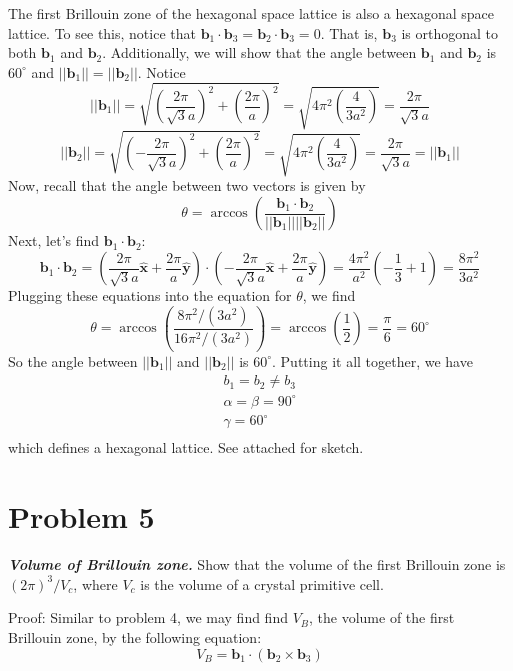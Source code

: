 \documentclass{article}
\begin{document}
The first Brillouin zone of the hexagonal space lattice is also a hexagonal space lattice. 
To see this, notice that $\textbf{b}_1 \cdot \textbf{b}_3 = \textbf{b}_2 \cdot \textbf{b}_3 = 0$. That is, $\textbf{b}_3$ is orthogonal to both $\textbf{b}_1$ and $\textbf{b}_2$. Additionally, we will show that the angle between $\textbf{b}_1$ and $\textbf{b}_2$ is $60^{\circ}$ and $||\textbf{b}_1|| = ||\textbf{b}_2||$.
\newline
Notice
\[||\textbf{b}_1|| = \sqrt{ \left(\frac{2\pi}{\sqrt{3}a}\right)^2 + \left( \frac{2\pi}{a} \right)^2} = \sqrt{4\pi^2\left( \frac{4}{3a^2} \right)} = \frac{2\pi}{\sqrt{3}a}\]
\[||\textbf{b}_2|| = \sqrt{\left(-\frac{2\pi}{\sqrt{3}a}\right)^2 + \left( \frac{2\pi}{a} \right)^2} = \sqrt{4\pi^2\left( \frac{4}{3a^2} \right)} = \frac{2\pi}{\sqrt{3}a} = ||\textbf{b}_1||\]
Now, recall that the angle between two vectors is given by
\[\theta = \arccos{\left( \frac{\textbf{b}_1 \cdot \textbf{b}_2}{||\textbf{b}_1||||\textbf{b}_2||} \right)}\]
Next, let's find $\textbf{b}_1 \cdot \textbf{b}_2$:
\[\textbf{b}_1 \cdot \textbf{b}_2 = \left( \frac{2\pi}{\sqrt{3}a}\hat{\textbf{x}} + \frac{2\pi}{a}\hat{\textbf{y}} \right) \cdot \left( -\frac{2\pi}{\sqrt{3}a}\hat{\textbf{x}} + \frac{2\pi}{a}\hat{\textbf{y}} \right) = \frac{4\pi^2}{a^2} \left( -\frac{1}{3} + 1 \right) = \frac{8\pi^2}{3a^2}\]
Plugging these equations into the equation for $\theta$, we find
\[\theta = \arccos{\left( \frac{8\pi^2/(3a^2)}{16\pi^2/(3a^2)} \right)} = \arccos{\left( \frac{1}{2} \right)} = \frac{\pi}{6} = 60^{\circ}\]
So the angle between $||\textbf{b}_1||$ and $||\textbf{b}_2||$ is $60^{\circ}$. Putting it all together, we have
\begin{align*}
    b_1 = b_2 \neq b_3\\
    \alpha = \beta = 90^{\circ}\\
    \gamma = 60^{\circ}\\
\end{align*}
which defines a hexagonal lattice. See attached for sketch.

\section*{Problem 5}


\textbf{\textit{Volume of Brillouin zone.}} Show that the volume of the first Brillouin zone is $(2 \pi)^3/V_c$, where $V_c$ is the volume of a crystal primitive cell. 
\newline

Proof: Similar to problem 4, we may find find $V_B$, the volume of the first Brillouin zone, by the following equation:
\begin{equation}
    V_B = \textbf{b}_1 \cdot (\textbf{b}_2 \times \textbf{b}_3)
\end{equation}
\end{document}
